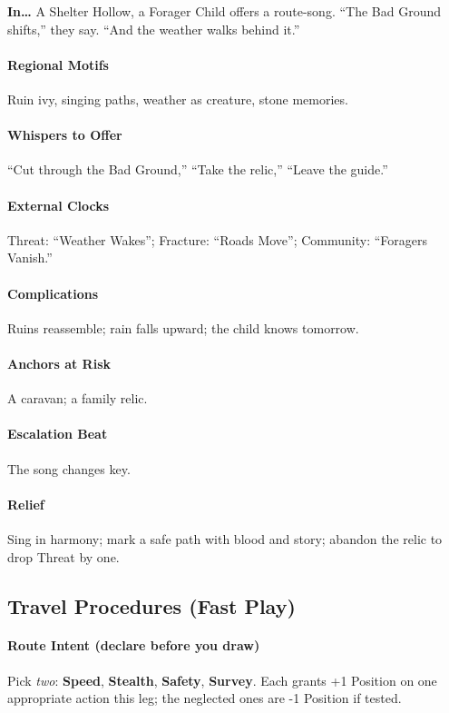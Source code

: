 \textbf{In…} A Shelter Hollow, a Forager Child offers a route-song. ``The Bad Ground shifts,'' they say. ``And the weather walks behind it.''
\paragraph{Regional Motifs} Ruin ivy, singing paths, weather as creature, stone memories.
\paragraph{Whispers to Offer} ``Cut through the Bad Ground,'' ``Take the relic,'' ``Leave the guide.''
\paragraph{External Clocks} Threat: ``Weather Wakes''; Fracture: ``Roads Move''; Community: ``Foragers Vanish.''
\paragraph{Complications} Ruins reassemble; rain falls upward; the child knows tomorrow.
\paragraph{Anchors at Risk} A caravan; a family relic.
\paragraph{Escalation Beat} The song changes key.
\paragraph{Relief} Sing in harmony; mark a safe path with blood and story; abandon the relic to drop Threat by one.

\subsection*{Travel Procedures (Fast Play)}

\paragraph{Route Intent (declare before you draw)}
Pick \emph{two}: \textbf{Speed}, \textbf{Stealth}, \textbf{Safety}, \textbf{Survey}.  
Each grants +1 Position on one appropriate action this leg; the neglected ones are -1 Position if tested.

